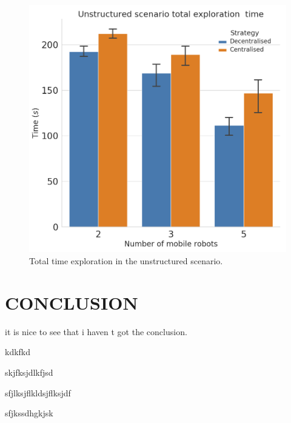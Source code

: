 \documentclass[letterpaper, 10 pt, conference]{ieeeconf}  %
\begin{document}
\begin{figure}[h!]
	\centering\includegraphics[width=0.7\columnwidth]{TT_unstructured.png}
	\caption{Total time exploration in the unstructured scenario.}
	\label{fig:unstruc_tt}
\end{figure}


\section{CONCLUSION}

it is nice to see that i haven t got the conclusion.

kdkfkd

skjfksjdlkfjsd

sfjlksjflkldsjflksjdf

sfjkssdhgkjsk
\addtolength{\textheight}{-12cm}   %


\newpage
\end{document}
